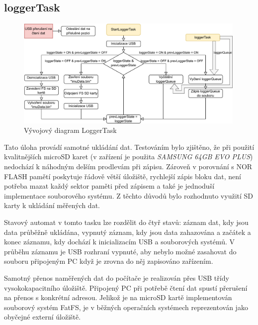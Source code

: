 \subsection{loggerTask} \label{loggerTask}
\begin{figure}[h]
    \centering
    \includegraphics[width=0.99\textwidth]{obrazky/LoggerTask}
    \caption{Vývojový diagram LoggerTask}
\end{figure}
Tato úloha provádí samotné ukládání dat. Testováním bylo zjištěno, že při použití kvalitnějších microSD karet (v zařízení je použita \emph{SAMSUNG 64GB EVO PLUS}) nedochází k náhodným delším prodlevám při zápisu. Zároveň v porovnání s NOR FLASH pamětí poskytuje řádově větší úložiště, rychlejší zápis bloku dat, není potřeba mazat každý sektor paměti před zápisem a také je jednoduší implementace souborového systému. Z těchto důvodů bylo rozhodnuto využití SD karty k ukládání měřených dat.

Stavový automat v tomto tasku lze rozdělit do čtyř stavů: záznam dat, kdy jsou data průběžně ukládána, vypnutý záznam, kdy jsou data zahazována a začátek a konec záznamu, kdy dochází k inicializacím USB a souborových systémů. V průběhu záznamu je USB rozhraní vypnuté, aby nebylo možné zasahovat do souboru připojeným PC když je zrovna do něj zapisováno zařízením.

Samotný přenos naměřených dat do počítače je realizován přes USB třídy vysokokapacitního úložiště. Připojený PC při potřebě čtení dat spustí přerušení na přenos s konkrétní adresou. Jelikož je na microSD kartě implementován souborový systém FatFS, je v běžných operačních systémech reprezentován jako obyčejné externí úložiště.

